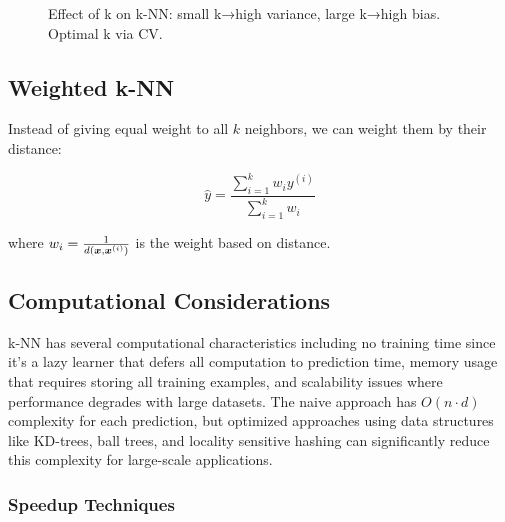 \begin{figure}[htbp]
\centering
{}
\caption{Effect of k on k-NN: small k→high variance, large k→high bias. Optimal k via CV.}
\label{fig:knn-k-selection}
\end{figure}

\subsection{Weighted k-NN}

Instead of giving equal weight to all $k$ neighbors, we can weight them by their distance:

\begin{equation}
\hat{y} = \frac{\sum_{i=1}^{k} w_i y^{(i)}}{\sum_{i=1}^{k} w_i}
\end{equation}

where $w_i = \frac{1}{d(\boldsymbol{x}, \boldsymbol{x}^{(i)})}$ is the weight based on distance.

\subsection{Computational Considerations}

k-NN has several computational characteristics including no training time since it's a lazy learner that defers all computation to prediction time, memory usage that requires storing all training examples, and scalability issues where performance degrades with large datasets. The naive approach has $O(n \cdot d)$ complexity for each prediction, but optimized approaches using data structures like KD-trees, ball trees, and locality sensitive hashing can significantly reduce this complexity for large-scale applications.

\subsubsection{Speedup Techniques}

